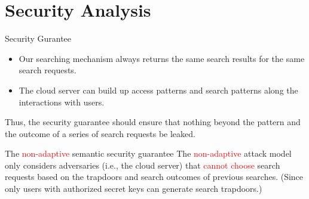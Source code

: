 \documentclass{beamer}
\begin{document}
\section{Security Analysis}

\begin{frame}{Security Gurantee}
	\begin{block}{}
		\begin{itemize}
			\item Our searching mechanism always returns the \textcolor{bazaar}{same} search results for the \textcolor{bazaar}{same} search requests.
			\item The cloud server can build up \textcolor[rgb]{0.0, 0.26, 0.15}{access patterns} and \textcolor[rgb]{0.0, 0.26, 0.15}{search patterns} along the interactions with users.
		\end{itemize}
	\end{block}
	
	\begin{alertblock}{}
		Thus, the security guarantee should ensure that nothing beyond the \textcolor[rgb]{0.0, 0.26, 0.15}{pattern} and
		\textcolor[rgb]{0.0, 0.26, 0.15}{the outcome of a series of search requests} be leaked.
	\end{alertblock}
	\begin{block}{The \textcolor{red}{non-adaptive} semantic security guarantee}
		The \textcolor{red}{non-adaptive} attack model only considers adversaries (i.e., the cloud server) that \textcolor{red}{cannot choose} search requests based on the trapdoors and search outcomes of previous searches. (Since only users with authorized secret keys can generate search trapdoors.)
	\end{block}
\end{frame}
\end{document}
